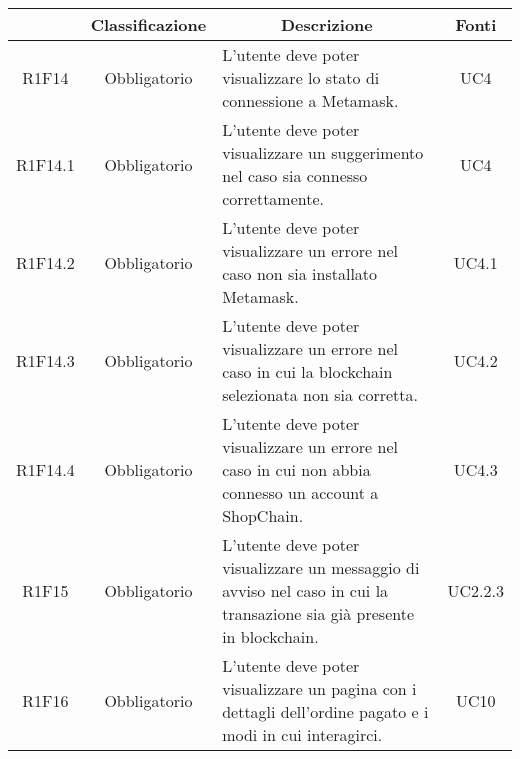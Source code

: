 \begin{table}[H]
    \centering
    \renewcommand{\arraystretch}{1.8}
    \begin{tabular}{c | c | p{6cm} | c}
        \rowcolor[HTML]{125E28}
        \multicolumn{1}{c}{\color[HTML]{FFFFFF} \textbf{Codice}}          &
        \multicolumn{1}{c}{\color[HTML]{FFFFFF} \textbf{Classificazione}} &
        \multicolumn{1}{c}{\color[HTML]{FFFFFF} \textbf{Descrizione}}     &
        \multicolumn{1}{c}{\color[HTML]{FFFFFF} \textbf{Fonti}}                                                                                                                                                                    \\
        \hline
        R1F14                                                             & Obbligatorio & L'utente deve poter visualizzare lo stato di connessione a Metamask\glo{}.                                                   & UC4      \\
        R1F14.1                                                           & Obbligatorio & L'utente deve poter visualizzare un suggerimento nel caso sia connesso correttamente.                                        & UC4      \\
        R1F14.2                                                           & Obbligatorio & L'utente deve poter visualizzare un errore nel caso non sia installato Metamask\glo{}.                                       & UC4.1    \\
        R1F14.3                                                           & Obbligatorio & L'utente deve poter visualizzare un errore nel caso in cui la blockchain selezionata non sia corretta.                       & UC4.2    \\
        R1F14.4                                                           & Obbligatorio & L'utente deve poter visualizzare un errore nel caso in cui non abbia connesso un account a ShopChain.                        & UC4.3    \\
        R1F15                                                             & Obbligatorio & L'utente deve poter visualizzare un messaggio di avviso nel caso in cui la transazione sia già presente in blockchain\glo{}. & UC2.2.3  \\
        R1F16                                                             & Obbligatorio & L'utente deve poter visualizzare un pagina con i dettagli dell'ordine pagato e i modi in cui interagirci.                    & UC10     \\

\end{tabular}
\end{table}
